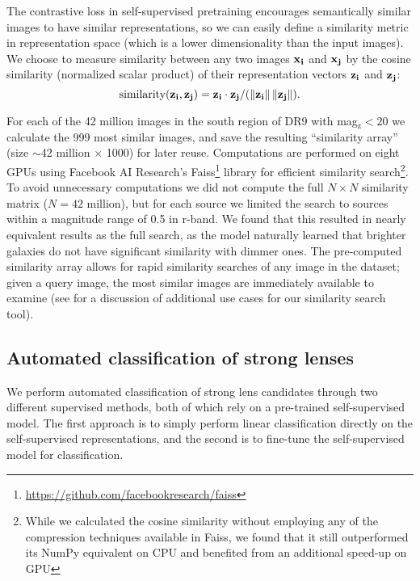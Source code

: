 \documentclass{aastex631}
\newcommand{\zmag}{mag$_{\mathrm{z}}$}
\begin{document}
The contrastive loss in self-supervised pretraining encourages semantically similar images to have similar representations, so we can easily define a similarity metric in representation space (which is a lower dimensionality than the input images). We choose to measure similarity between any two images $\bf{x_i}$ and $\bf{x_j}$ by the cosine similarity (normalized scalar product) of their representation vectors $\bf{z_i}$ and $\bf{z_j}$:
\begin{equation}
    \text{similarity}(\bf{z_i},\bf{z_j}) = \bf{z_i} \cdot \bf{z_j}/ (\| \bf{z_i} \| \, \| \bf{z_j} \| ).
\end{equation}

For each of the 42 million images in the south region of DR9 with \zmag $< 20$ we calculate the 999 most similar images, and save the resulting ``similarity array'' (size $\sim$42 million $\times$ 1000) for later reuse. Computations are performed on eight GPUs using Facebook AI Research's Faiss\footnote{\url{https://github.com/facebookresearch/faiss}} library for efficient similarity search\footnote{While we calculated the cosine similarity without employing any of the compression techniques available in Faiss, we found that it still outperformed its NumPy equivalent on CPU and benefited from an additional speed-up on GPU}. To avoid unnecessary computations we did not compute the full $N\times N$ similarity matrix ($N=42$ million), but for each source we limited the search to sources within a magnitude range of 0.5 in r-band. We found that this resulted in nearly equivalent results as the full search, as the model naturally learned that brighter galaxies do not have significant similarity with dimmer ones. The pre-computed similarity array allows for rapid similarity searches of any image in the dataset; given a query image, the most similar images are immediately available to examine (see \cite{neurips_similarity} for a discussion of additional use cases for our similarity search tool).

\subsection{Automated classification of strong lenses}
\label{sec:classification}

We perform automated classification of strong lens candidates through two different supervised methods, both of which rely on a pre-trained self-supervised model. The first approach is to simply perform linear classification directly on the self-supervised representations, and the second is to fine-tune the self-supervised model for classification.
\end{document}
